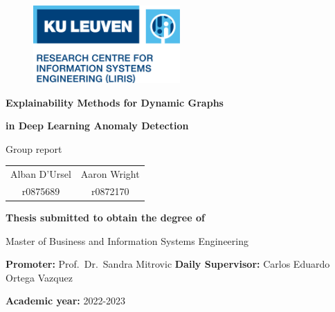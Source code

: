\begin{titlepage}

\begin{figure}[h]
    {\includegraphics[width=0.5\textwidth]{images/logo.png}}
\end{figure}

\vspace*{2cm}
{\Huge \textbf{Explainability Methods for Dynamic Graphs}}

\vspace{.1cm}
{\Huge \textbf{in Deep Learning Anomaly Detection}}
\vspace*{0.5cm} 

{\Large Group report}

{\raggedleft\vfill{
\setlength{\tabcolsep}{12pt}
\begin{tabular}{c c}
        {\Large Alban D'Ursel}  &  {\Large Aaron Wright} \\
        {r0875689}  & {r0872170}
\end{tabular}
\linebreak
\vspace*{1.5cm}

\textbf{{\large Thesis submitted to obtain \linebreak
the degree of}} \linebreak

{\large Master of Business and Information Systems Engineering}\linebreak

\textbf{{\large Promoter:}}   Prof.\ Dr.\ Sandra Mitrovic \linebreak
\textbf{{\large Daily Supervisor:}}  Carlos Eduardo Ortega Vazquez \linebreak

\textbf{{\large Academic year:}} {\large 2022-2023}
\linebreak
}\par}

\end{titlepage}
\restoregeometry
\clearpage